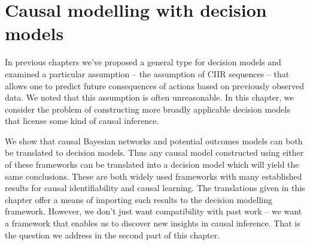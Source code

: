 
\chapter{Causal modelling with decision models}\label{ch:other_causal_frameworks}

In previous chapters we've proposed a general type for decision models and examined a particular assumption -- the assumption of CIIR sequences -- that allows one to predict future consequences of actions based on previously observed data. We noted that this assumption is often unreasonable. In this chapter, we consider the problem of constructing more broadly applicable decision models that license some kind of causal inference. 

We show that causal Bayesian networks and potential outcomes models can both be translated to decision models. Thus any causal model constructed using either of these frameworks can be translated into a decision model which will yield the same conclusions. These are both widely used frameworks with many established results for causal identifiability and causal learning. The translations given in this chapter offer a means of importing such results to the decision modelling framework. However, we don't just want compatibility with past work -- we want a framework that enables us to discover new insights in causal inference. That is the question we address in the second part of this chapter.

